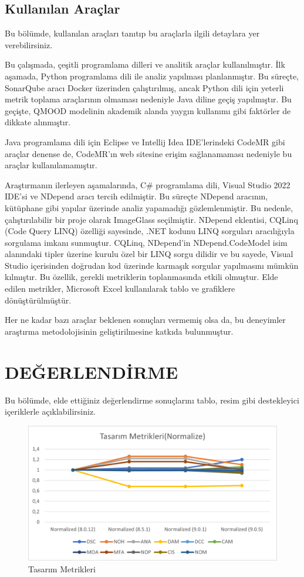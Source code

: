 \documentclass[conference]{IEEEtran}
\begin{document}
\subsection{Kullanılan Araçlar}

Bu bölümde, kullanılan araçları tanıtıp bu araçlarla ilgili detaylara yer verebilirsiniz.

Bu çalışmada, çeşitli programlama dilleri ve analitik araçlar kullanılmıştır. İlk aşamada, Python programlama dili ile analiz yapılması planlanmıştır. Bu süreçte, SonarQube aracı Docker üzerinden çalıştırılmış, ancak Python dili için yeterli metrik toplama araçlarının olmaması nedeniyle Java diline geçiş yapılmıştır. Bu geçişte, QMOOD modelinin akademik alanda yaygın kullanımı gibi faktörler de dikkate alınmıştır.

Java programlama dili için Eclipse ve Intellij Idea IDE'lerindeki CodeMR gibi araçlar denense de, CodeMR'ın web sitesine erişim sağlanamaması nedeniyle bu araçlar kullanılamamıştır.

Araştırmanın ilerleyen aşamalarında, C\# programlama dili, Visual Studio 2022 IDE'si ve NDepend aracı tercih edilmiştir. Bu süreçte NDepend aracının, kütüphane gibi yapılar üzerinde analiz yapamadığı gözlemlenmiştir. Bu nedenle, çalıştırılabilir bir proje olarak ImageGlass seçilmiştir. NDepend eklentisi, CQLinq (Code Query LINQ) özelliği sayesinde, .NET kodunu LINQ sorguları aracılığıyla sorgulama imkanı sunmuştur. CQLinq, NDepend'in NDepend.CodeModel isim alanındaki tipler üzerine kurulu özel bir LINQ sorgu dilidir ve bu sayede, Visual Studio içerisinden doğrudan kod üzerinde karmaşık sorgular yapılmasını mümkün kılmıştır. Bu özellik, gerekli metriklerin toplanmasında etkili olmuştur. Elde edilen metrikler, Microsoft Excel kullanılarak tablo ve grafiklere dönüştürülmüştür.

Her ne kadar bazı araçlar beklenen sonuçları vermemiş olsa da, bu deneyimler araştırma metodolojisinin geliştirilmesine katkıda bulunmuştur.

\section{DEĞERLENDİRME}
Bu bölümde, elde ettiğiniz değerlendirme sonuçlarını tablo, resim gibi destekleyici içeriklerle açıklabilirsiniz.

\begin{figure}[h]
	\centering
	\includegraphics[scale=0.6]{metrik.png}
	\caption{Tasarım Metrikleri}
	\label{sekil1}
\end{figure}
\end{document}
